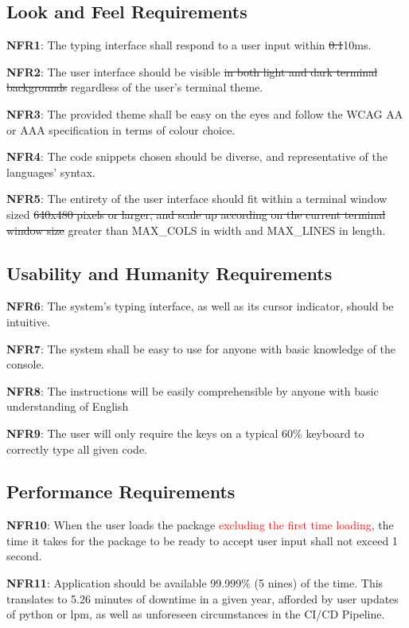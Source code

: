 \documentclass[12pt, titlepage]{article}
\begin{document}
\subsection{Look and Feel Requirements}

\noindent \textbf{NFR1}: The typing interface shall respond to a user input within \sout{0.1}{\color{red}10}ms.

\noindent \textbf{NFR2}: The user interface should be visible \sout{in both light and dark terminal backgrounds} {\color{red}regardless of the user's terminal theme}.

\noindent \textbf{NFR3}: The provided theme shall be easy on the eyes and follow the WCAG AA or AAA specification in terms of colour choice.

\noindent \textbf{NFR4}: The code snippets chosen should be diverse, and representative of the languages' syntax.

\noindent \textbf{NFR5}: The entirety of the user interface should fit within a terminal window sized \sout{640x480 pixels or larger, and scale up according on the current terminal window size} {\color{red} greater than MAX\_COLS in width and MAX\_LINES in length}.

\subsection{Usability and Humanity Requirements}

\noindent \textbf{NFR6}: The system's typing interface, as well as its cursor indicator, should be intuitive.

\noindent \textbf{NFR7}: The system shall be easy to use for anyone with basic knowledge of the console.

\noindent \textbf{NFR8}: The instructions will be easily comprehensible by anyone with basic understanding of English

\noindent \textbf{NFR9}: The user will only require the keys on a typical 60\% keyboard to correctly type all given code.

\subsection{Performance Requirements}
\noindent \textbf{NFR10}: When the user loads the package \textcolor{red}{excluding the first time loading}, the time it takes for the package to be ready to accept user input shall not exceed 1 second.

\noindent \textbf{NFR11}: Application should be available 99.999\% (5 nines) of the time. This translates to 5.26 minutes of downtime in a given year, afforded by user updates of python or lpm, as well as unforeseen circumstances in the CI/CD Pipeline.
\end{document}
